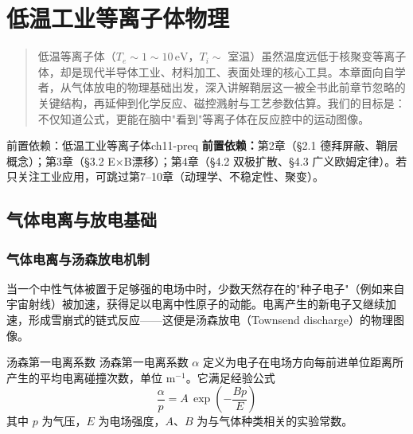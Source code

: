 \documentclass[12pt,a4paper,openany,oneside]{book}
\newcommand{\difficulty}[1]{\marginnote{\hfill\textcolor{coverMid!80}{\rule[-0.1em]{2pt}{0.9em}}\,\textcolor{coverMid}{\footnotesize\textbf{[#1]}}}}
\newenvironment{chapterintro}{%
  \begin{quotation}\itshape\small%
}{%
  \end{quotation}%
}
\begin{document}



\chapter{低温工业等离子体物理}\label{ch:11}

\begin{chapterintro}
低温等离子体（$T_e \sim 1\sim 10\,\mathrm{eV}$，$T_i \sim$ 室温）虽然温度远低于核聚变等离子体，却是现代半导体工业、材料加工、表面处理的核心工具。本章面向自学者，从气体放电的物理基础出发，深入讲解鞘层这一被全书此前章节忽略的关键结构，再延伸到化学反应、磁控溅射与工艺参数估算。我们的目标是：不仅知道公式，更能在脑中"看到"等离子体在反应腔中的运动图像。
\end{chapterintro}

\begin{tip}{前置依赖：低温工业等离子体}{ch11-preq}
\textbf{前置依赖：}第2章（\S2.1 德拜屏蔽、鞘层概念）；第3章（\S3.2 E×B漂移）；第4章（\S4.2 双极扩散、\S4.3 广义欧姆定律）。若只关注工业应用，可跳过第7--10章（动理学、不稳定性、聚变）。
\end{tip}

\section{气体电离与放电基础}
\difficulty{基础}

\subsection{气体电离与汤森放电机制}

当一个中性气体被置于足够强的电场中时，少数天然存在的"种子电子"（例如来自宇宙射线）被加速，获得足以电离中性原子的动能。电离产生的新电子又继续加速，形成雪崩式的链式反应——这便是汤森放电（Townsend discharge）的物理图像。

\begin{definition}{汤森第一电离系数}{}{}
\label{def:townsend-alpha}
汤森第一电离系数 $\alpha$ 定义为电子在电场方向每前进单位距离所产生的平均电离碰撞次数，单位 $\mathrm{m^{-1}}$。它满足经验公式
\begin{equation}
\label{eq:townsend-alpha}
\frac{\alpha}{p} = A \,\exp\!\left(-\frac{Bp}{E}\right)
\end{equation}
其中 $p$ 为气压，$E$ 为电场强度，$A$、$B$ 为与气体种类相关的实验常数。
\end{definition}
\end{document}
